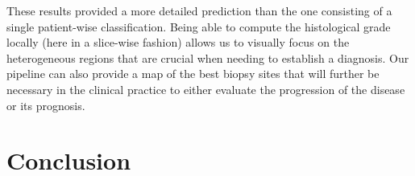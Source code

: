 \documentclass[]{article}
\begin{document}
These results provided a more detailed prediction than the one
consisting of a single patient-wise classification. Being able to
compute the histological grade locally (here in a slice-wise fashion)
allows us to visually focus on the heterogeneous regions that are
crucial when needing to establish a diagnosis. Our pipeline can also
provide a map of the best biopsy sites that will further be necessary in
the clinical practice to either evaluate the progression of the disease
or its prognosis.\\


\section{Conclusion}



\newpage
%
\printbibliography[heading=bibintoc]
\end{document}
